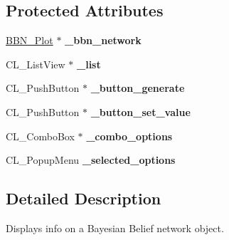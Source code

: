 \subsection*{Protected Attributes}
\begin{DoxyCompactItemize}
\item 
\hypertarget{classBBN__Info_a56941d8987e0943d71dda1bfe84f372b}{
\hyperlink{classBBN__Plot}{BBN\_\-Plot} $\ast$ {\bfseries \_\-bbn\_\-network}}
\label{classBBN__Info_a56941d8987e0943d71dda1bfe84f372b}

\item 
\hypertarget{classBBN__Info_a8e385cd5dc8eabc548dc3c5e88fb3516}{
CL\_\-ListView $\ast$ {\bfseries \_\-list}}
\label{classBBN__Info_a8e385cd5dc8eabc548dc3c5e88fb3516}

\item 
\hypertarget{classBBN__Info_aff3b5b3309424146d7614335fe3377ac}{
CL\_\-PushButton $\ast$ {\bfseries \_\-button\_\-generate}}
\label{classBBN__Info_aff3b5b3309424146d7614335fe3377ac}

\item 
\hypertarget{classBBN__Info_abfc41072a1064daee369df064c324e0f}{
CL\_\-PushButton $\ast$ {\bfseries \_\-button\_\-set\_\-value}}
\label{classBBN__Info_abfc41072a1064daee369df064c324e0f}

\item 
\hypertarget{classBBN__Info_af327a85a05986d9777965f2e69fc6392}{
CL\_\-ComboBox $\ast$ {\bfseries \_\-combo\_\-options}}
\label{classBBN__Info_af327a85a05986d9777965f2e69fc6392}

\item 
\hypertarget{classBBN__Info_a72165f5a31da5ec0db7fa6ffc6d2a858}{
CL\_\-PopupMenu {\bfseries \_\-selected\_\-options}}
\label{classBBN__Info_a72165f5a31da5ec0db7fa6ffc6d2a858}

\end{DoxyCompactItemize}


\subsection{Detailed Description}
Displays info on a Bayesian Belief network object. 

